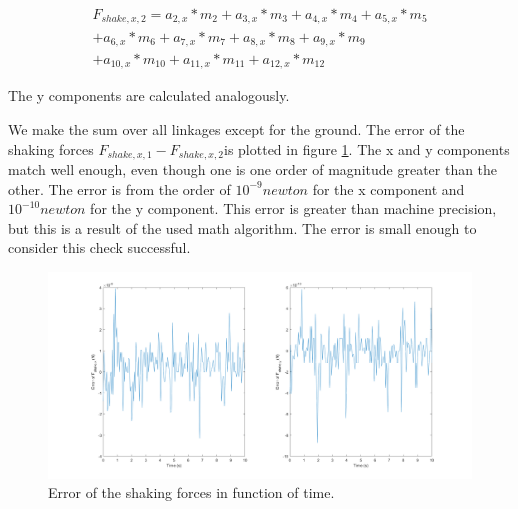 \documentclass[a4paper]{article}
\begin{document}
\begin{equation}
\begin{split}
	F_{shake,x,2} =  a_{2,x}*m_2 + a_{3,x}*m_3 + a_{4,x}*m_4 + a_{5,x}*m_5 \\ 
	 +a_{6,x}*m_6	+ a_{7,x}*m_7 + a_{8,x}*m_8 + a_{9,x}*m_9 \\
	 + a_{10,x}*m_{10} + a_{11,x}*m_{11} + a_{12,x}*m_{12}
\end{split}
\end{equation}



The y components are calculated analogously.

We make the sum over all linkages except for the ground. The error of the shaking forces \(F_{shake,x,1}-F_{shake,x,2}\)is plotted in  figure \ref{fig:contrdyn}. The x and y components match well enough, even though one is one order of magnitude greater than the other. The error is from the order of \(10^{-9} \si{newton}\) for the x component and \(10^{-10} \si{newton}\) for the y component. This error is greater than machine precision, but this is a result of the used math algorithm. The error is small enough to consider this check successful.

\begin{figure}
	\centering
	
	\includegraphics[width = \textwidth]{contrdyn.png}
	
	\caption{Error of the shaking forces in function of time.}
	\label{fig:contrdyn}
	
\end{figure}



\end{document}
